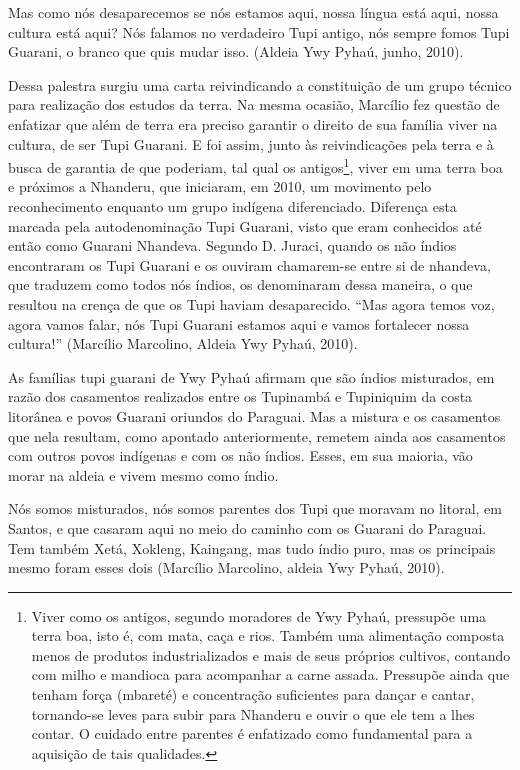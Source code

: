 \documentclass{article}
\begin{document}
Mas como n\'os desaparecemos se n\'os estamos aqui, nossa l\'ingua
est\'a aqui, nossa cultura est\'a aqui? N\'os falamos no verdadeiro
Tupi antigo, n\'os sempre fomos Tupi Guarani, o branco que quis mudar
isso. (Aldeia Ywy Pyha\'u, junho, 2010).

Dessa palestra surgiu uma carta reivindicando a constitui\c{c}\~ao de um
grupo t\'ecnico para realiza\c{c}\~ao dos estudos da terra. Na mesma
ocasi\~ao, Marc\'ilio fez quest\~ao de enfatizar que al\'em de terra
era preciso garantir o direito de sua fam\'ilia viver na cultura, de
ser Tupi Guarani. E foi assim, junto \`as reivindica\c{c}\~oes pela
terra e \`a busca de garantia de que poderiam, tal qual os
antigos\footnote{ Viver como os antigos, segundo moradores de Ywy
Pyha\'u, pressup\~oe uma terra boa, isto \'e, com mata, ca\c{c}a e
rios. Tamb\'em uma alimenta\c{c}\~ao composta menos de produtos
industrializados e mais de seus pr\'oprios cultivos, contando com milho
e mandioca para acompanhar a carne assada. Pressup\~oe ainda que tenham
for\c{c}a (mbaret\'e) e concentra\c{c}\~ao suficientes para dan\c{c}ar
e cantar, tornando-se leves para subir para Nhanderu  e ouvir o que ele
tem a lhes contar. O cuidado entre parentes \'e enfatizado como
fundamental para a aquisi\c{c}\~ao de tais qualidades.}, viver em uma
terra boa e pr\'oximos a Nhanderu, que iniciaram, em 2010, um movimento
pelo reconhecimento enquanto um grupo ind\'igena diferenciado.
Diferen\c{c}a esta marcada pela autodenomina\c{c}\~ao Tupi Guarani,
visto que eram conhecidos at\'e ent\~ao como Guarani Nhandeva. Segundo
D. Juraci, quando os n\~ao \'indios encontraram os Tupi Guarani e os
ouviram chamarem-se entre si de nhandeva, que traduzem como todos n\'os
\'indios, os denominaram dessa maneira, o que resultou na cren\c{c}a de
que os Tupi haviam desaparecido. {\textquotedblleft}Mas agora temos
voz, agora vamos falar, n\'os Tupi Guarani estamos aqui e vamos
fortalecer nossa cultura!{\textquotedblright} (Marc\'ilio Marcolino,
Aldeia Ywy Pyha\'u, 2010).

As fam\'ilias tupi guarani de Ywy Pyha\'u afirmam que s\~ao \'indios
misturados, em raz\~ao dos casamentos realizados entre os Tupinamb\'a e
Tupiniquim da costa litor\^anea e povos Guarani oriundos do Paraguai.
Mas a mistura e os casamentos que nela resultam, como apontado
anteriormente, remetem ainda aos casamentos com outros povos
ind\'igenas e com os n\~ao \'indios. Esses, em sua maioria, v\~ao morar
na aldeia e vivem mesmo como \'indio.

N\'os somos misturados, n\'os somos parentes dos Tupi que moravam no
litoral, em Santos, e que casaram aqui no meio do caminho com os
Guarani do Paraguai. Tem tamb\'em Xet\'a, Xokleng, Kaingang, mas tudo
\'indio puro, mas os principais mesmo foram esses dois (Marc\'ilio
Marcolino, aldeia Ywy Pyha\'u, 2010).
\end{document}
